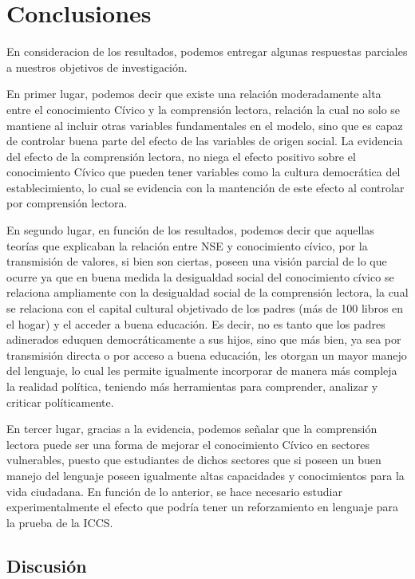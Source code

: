 \documentclass[12pt,twoside]{templates/facsothesis}
\begin{document}
\hypertarget{conclusiones}{%
\chapter{Conclusiones}\label{conclusiones}}

En consideracion de los resultados, podemos entregar algunas respuestas parciales a nuestros objetivos de investigación.

En primer lugar, podemos decir que existe una relación moderadamente alta entre el conocimiento Cívico y la comprensión lectora, relación la cual no solo se mantiene al incluir otras variables fundamentales en el modelo, sino que es capaz de controlar buena parte del efecto de las variables de origen social. La evidencia del efecto de la comprensión lectora, no niega el efecto positivo sobre el conocimiento Cívico que pueden tener variables como la cultura democrática del establecimiento, lo cual se evidencia con la mantención de este efecto al controlar por comprensión lectora.

En segundo lugar, en función de los resultados, podemos decir que aquellas teorías que explicaban la relación entre NSE y conocimiento cívico, por la transmisión de valores, si bien son ciertas, poseen una visión parcial de lo que ocurre ya que en buena medida la desigualdad social del conocimiento cívico se relaciona ampliamente con la desigualdad social de la comprensión lectora, la cual se relaciona con el capital cultural objetivado de los padres (más de 100 libros en el hogar) y el acceder a buena educación. Es decir, no es tanto que los padres adinerados eduquen democráticamente a sus hijos, sino que más bien, ya sea por transmisión directa o por acceso a buena educación, les otorgan un mayor manejo del lenguaje, lo cual les permite igualmente incorporar de manera más compleja la realidad política, teniendo más herramientas para comprender, analizar y criticar políticamente.

En tercer lugar, gracias a la evidencia, podemos señalar que la comprensión lectora puede ser una forma de mejorar el conocimiento Cívico en sectores vulnerables, puesto que estudiantes de dichos sectores que si poseen un buen manejo del lenguaje poseen igualmente altas capacidades y conocimientos para la vida ciudadana. En función de lo anterior, se hace necesario estudiar experimentalmente el efecto que podría tener un reforzamiento en lenguaje para la prueba de la ICCS.

\hypertarget{discusiuxf3n}{%
\section{Discusión}\label{discusiuxf3n}}
\end{document}
